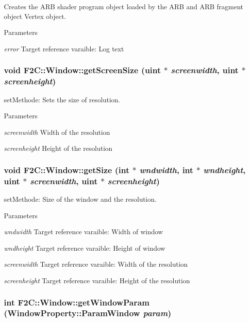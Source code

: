 Creates the ARB shader program object loaded by the ARB and ARB fragment object Vertex object. 
\begin{DoxyParams}{Parameters}
\item[{\em error}]Target reference varaible: Log text \end{DoxyParams}
\hypertarget{class_f2_c_1_1_window_a89e19f862d823bd9d9093022f5ebe314}{
\subsubsection[{getScreenSize}]{\setlength{\rightskip}{0pt plus 5cm}void F2C::Window::getScreenSize ({\bf uint} $\ast$ {\em screenwidth}, \/  {\bf uint} $\ast$ {\em screenheight})}}
\label{class_f2_c_1_1_window_a89e19f862d823bd9d9093022f5ebe314}


setMethode: Sets the size of resolution. 
\begin{DoxyParams}{Parameters}
\item[{\em screenwidth}]Width of the resolution \item[{\em screenheight}]Height of the resolution \end{DoxyParams}
\hypertarget{class_f2_c_1_1_window_a907540c263f7a326ca72e498f36aaddd}{
\subsubsection[{getSize}]{\setlength{\rightskip}{0pt plus 5cm}void F2C::Window::getSize (int $\ast$ {\em wndwidth}, \/  int $\ast$ {\em wndheight}, \/  {\bf uint} $\ast$ {\em screenwidth}, \/  {\bf uint} $\ast$ {\em screenheight})}}
\label{class_f2_c_1_1_window_a907540c263f7a326ca72e498f36aaddd}


setMethode: Size of the window and the resolution. 
\begin{DoxyParams}{Parameters}
\item[{\em wndwidth}]Target reference varaible: Width of window \item[{\em wndheight}]Target reference varaible: Height of window \item[{\em screenwidth}]Target reference varaible: Width of the resolution \item[{\em screenheight}]Target reference varaible: Height of the resolution \end{DoxyParams}
\hypertarget{class_f2_c_1_1_window_add95e367e862fa5b4e71892920204bc3}{
\subsubsection[{getWindowParam}]{\setlength{\rightskip}{0pt plus 5cm}int F2C::Window::getWindowParam ({\bf WindowProperty::ParamWindow} {\em param})}}
\label{class_f2_c_1_1_window_add95e367e862fa5b4e71892920204bc3}


